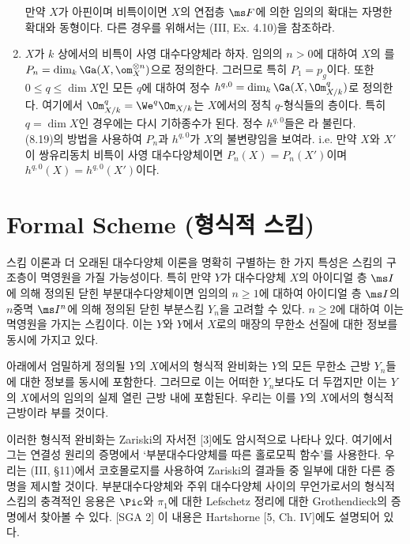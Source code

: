 \begin{enumerate}[label=\tb{8.\arabic*.},itemindent=0mm,itemsep=2mm]
	만약 $X$가 아핀이며 비특이이면 $X$의 연접층 $\ms F$에 의한 임의의 확대는 자명한 확대와 동형이다.
	다른 경우를 위해서는 (III, Ex. 4.10)을 참조하라.
	\item $X$가 $k$ 상에서의 비특이 사영 대수다양체라 하자. 임의의 $n>0$에 대하여 $X$의 를
	$P_n=\dim_k\Ga(X,\om_X^{\otimes n})$으로 정의한다. 그러므로 특히 $P_1=p_g$이다.
	또한 $0\le q\le\dim X$인 모든 $q$에 대하여 정수 $h^{q,0}=\dim_k\Ga(X,\Om^q_{X/k})$로 정의한다.
	여기에서 $\Om^q_{X/k}=\We^q\Om_{X/k}$는 $X$에서의 정칙 $q$-형식들의 층이다.
	특히 $q=\dim X$인 경우에는 다시 기하종수가 된다. 정수 $h^{q,0}$들은 라 불린다.\\
	(8.19)의 방법을 사용하여 $P_n$과 $h^{q,0}$가 $X$의 불변량임을 보여라.
	i.e. 만약 $X$와 $X'$이 쌍유리동치 비특이 사영 대수다양체이면 $P_n(X)=P_n(X')$이며 $h^{q,0}(X)=h^{q,0}(X')$이다.
	\end{enumerate}
	
	
	
	\section{Formal Scheme (형식적 스킴)}
	스킴 이론과 더 오래된 대수다양체 이론을 명확히 구별하는 한 가지 특성은 스킴의 구조층이 멱영원을 가질 가능성이다.
	특히 만약 $Y$가 대수다양체 $X$의 아이디얼 층 $\ms I$에 의해 정의된 닫힌 부분대수다양체이면
	임의의 $n\ge 1$에 대하여 아이디얼 층 $\ms I$의 $n$중멱 $\ms I^n$에 의해 정의된 닫힌 부분스킴 $Y_n$을 고려할 수 있다.
	$n\ge 2$에 대하여 이는 멱영원을 가지는 스킴이다. 이는 $Y$와 $Y$에서 $X$로의 매장의 무한소 선질에 대한 정보를 동시에 가지고 있다.
	
	아래에서 엄밀하게 정의될 $Y$의 $X$에서의 형식적 완비화는 $Y$의 모든 무한소 근방 $Y_n$들에 대한 정보를 동시에 포함한다.
	그러므로 이는 어떠한 $Y_n$보다도 더 두껍지만 이는 $Y$의 $X$에서의 임의의 실제 열린 근방 내에 포함된다.
	우리는 이를 $Y$의 $X$에서의 형식적 근방이라 부를 것이다.
	
	이러한 형식적 완비화는 Zariski의 자서전 [3]에도 암시적으로 나타나 있다.
	여기에서 그는 연결성 원리의 증명에서 `부분대수다양체를 따른 홀로모픽 함수'를 사용한다.
	우리는 (III, \S 11)에서 코호몰로지를 사용하여 Zariski의 결과들 중 일부에 대한 다른 증명을 제시할 것이다.
	부분대수다양체와 주위 대수다양체 사이의 무언가로서의 형식적 스킴의 충격적인 응용은
	$\Pic$와 $\pi_1$에 대한 Lefschetz 정리에 대한 Grothendieck의 증명에서 찾아볼 수 있다. [SGA 2]
	이 내용은 Hartshorne [5, Ch. IV]에도 설명되어 있다.
	
